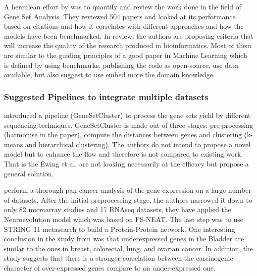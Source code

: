 
A herculean effort by \citet{Xie2021-al} was to quantify and review the work done in the field of Gene Set Analysis. They reviewed 504 papers and looked at its performance based on citations and how it correlates with different approaches and how the models have been benchmarked. In review, the authors are proposing criteria that will increase the quality of the research produced in bioinformatics. Most of them are similar to the guiding principles of a good paper in Machine Learning which is defined by using benchmarks, publishing the code as open-source, use data available, but also suggest to use embed more the domain knowledge.


\subsubsection*{Suggested Pipelines to integrate multiple datasets} \label{s:pipelines}


\citet{Ewing2020-os} introduced a pipeline (GeneSetCluster) to process the gene sets yield by different sequencing techniques. GeneSetCluster is made out of three stages: pre-processing (harmonise in the paper), compute the distances between genes and clustering (k-means and hierarchical clustering). The authors do not intend to propose a novel model but to enhance the flow and therefore is not compared to existing work. That is the Ewing et al. are not looking necessarily at the efficacy but propose a general solution.

\citet{Feltes2020-bz} perform a thorough pan-cancer analysis of the gene expression on a large number of datasets. After the initial preprocessing stage, the authors narrowed it down to only 82 microarray studies and 17 RNAseq datasets, they have applied the Neuroevolution model\cite{Grisci2019-xn} which was based on FS-NEAT\cite{Whiteson2005-dn}. The last step was to use STRING 11\cite{Szklarczyk2019-pu} metasearch to build a Protein-Protein network. One interesting conclusion in the study from \cite{Feltes2020-bz} was that underexpressed genes in the Bladder are similar to the ones in breast, colorectal, lung, and ovarian cancer. In addition, the study suggests that there is a stronger correlation between the carcinogenic character of over-expressed genes compare to an under-expressed one.

